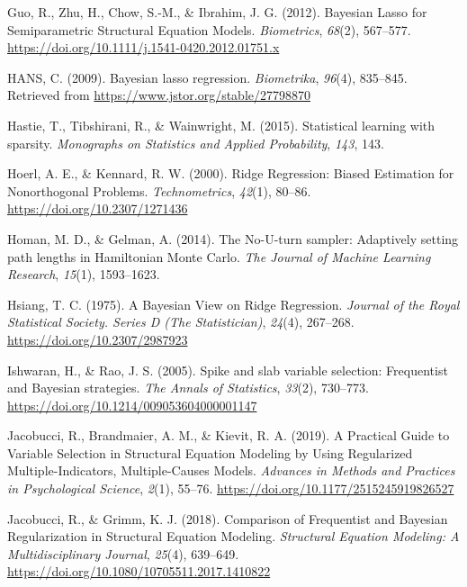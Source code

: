 \documentclass[
  man, donotrepeattitle,floatsintext]{apa6}
\newlength{\cslhangindent}
\newlength{\cslentryspacingunit} %
\newenvironment{CSLReferences}[2] %
 {%
  \setlength{\parindent}{0pt}
  \ifodd #1
  \let\oldpar\par
  \def\par{\hangindent=\cslhangindent\oldpar}
  \fi
  \setlength{\parskip}{#2\cslentryspacingunit}
 }%
 {}
\begin{document}
\begin{CSLReferences}{1}{0}
\leavevmode{}%
Guo, R., Zhu, H., Chow, S.-M., \& Ibrahim, J. G. (2012). Bayesian {Lasso} for {Semiparametric} {Structural} {Equation} {Models}. \emph{Biometrics}, \emph{68}(2), 567--577. \url{https://doi.org/10.1111/j.1541-0420.2012.01751.x}

\leavevmode{}%
HANS, C. (2009). Bayesian lasso regression. \emph{Biometrika}, \emph{96}(4), 835--845. Retrieved from \url{https://www.jstor.org/stable/27798870}

\leavevmode{}%
Hastie, T., Tibshirani, R., \& Wainwright, M. (2015). Statistical learning with sparsity. \emph{Monographs on Statistics and Applied Probability}, \emph{143}, 143.

\leavevmode{}%
Hoerl, A. E., \& Kennard, R. W. (2000). Ridge {Regression}: {Biased} {Estimation} for {Nonorthogonal} {Problems}. \emph{Technometrics}, \emph{42}(1), 80--86. \url{https://doi.org/10.2307/1271436}

\leavevmode{}%
Homan, M. D., \& Gelman, A. (2014). The {No}-{U}-turn sampler: Adaptively setting path lengths in {Hamiltonian} {Monte} {Carlo}. \emph{The Journal of Machine Learning Research}, \emph{15}(1), 1593--1623.

\leavevmode{}%
Hsiang, T. C. (1975). A {Bayesian} {View} on {Ridge} {Regression}. \emph{Journal of the Royal Statistical Society. Series D (The Statistician)}, \emph{24}(4), 267--268. \url{https://doi.org/10.2307/2987923}

\leavevmode{}%
Ishwaran, H., \& Rao, J. S. (2005). Spike and slab variable selection: {Frequentist} and {Bayesian} strategies. \emph{The Annals of Statistics}, \emph{33}(2), 730--773. \url{https://doi.org/10.1214/009053604000001147}

\leavevmode{}%
Jacobucci, R., Brandmaier, A. M., \& Kievit, R. A. (2019). A {Practical} {Guide} to {Variable} {Selection} in {Structural} {Equation} {Modeling} by {Using} {Regularized} {Multiple}-{Indicators}, {Multiple}-{Causes} {Models}. \emph{Advances in Methods and Practices in Psychological Science}, \emph{2}(1), 55--76. \url{https://doi.org/10.1177/2515245919826527}

\leavevmode{}%
Jacobucci, R., \& Grimm, K. J. (2018). Comparison of {Frequentist} and {Bayesian} {Regularization} in {Structural} {Equation} {Modeling}. \emph{Structural Equation Modeling: A Multidisciplinary Journal}, \emph{25}(4), 639--649. \url{https://doi.org/10.1080/10705511.2017.1410822}


\end{CSLReferences}
\end{document}
